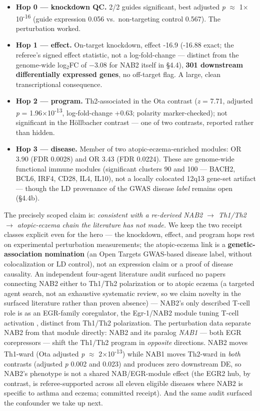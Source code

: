 \begin{itemize}
\tightlist
\item
  \textbf{Hop 0 --- knockdown QC.} 2/2 guides significant, best adjusted \emph{p} $\approx$ 1$\times$10\textsuperscript{-}\textsuperscript{1}\textsuperscript{6} (guide expression 0.056
  vs.~non-targeting control 0.567). The perturbation worked.
\item
  \textbf{Hop 1 --- effect.} On-target knockdown, effect -16.9 (-16.88 exact; the referee's signed effect
  statistic, not a log-fold-change --- distinct from the genome-wide log$_2$FC of $-3.08$ for NAB2 itself in
  \S{}4.4), \textbf{301 downstream differentially expressed genes}, no off-target flag. A large, clean
  transcriptional consequence.
\item
  \textbf{Hop 2 --- program.} Th2-associated in the Ota contrast \cite{ota2021} (\emph{z} = 7.71, adjusted \emph{p} = 1.96$\times$10\textsuperscript{-}\textsuperscript{1}\textsuperscript{3},
  log-fold-change +0.63; polarity marker-checked); not significant in the H\"{o}llbacher contrast \cite{hollbacher2020} --- one of
  two contrasts, reported rather than hidden.
\item
  \textbf{Hop 3 --- disease.} Member of two atopic-eczema-enriched modules: OR 3.90 (FDR 0.0028) and OR 3.43
  (FDR 0.0224). These are genome-wide functional immune modules (significant clusters 90 and 100 ---
  BACH2, BCL6, IRF4, CD28, IL4, IL10), not a locally colocated 12q13 gene-set artifact --- though the LD
  provenance of the GWAS disease \emph{label} remains open (\S{}4.4b).
\end{itemize}

The precisely scoped claim is: \emph{consistent with a re-derived NAB2 $\rightarrow$ Th1/Th2 $\rightarrow$ atopic-eczema chain the literature
has not made.} We keep the two receipt classes explicit even for the hero --- the knockdown, effect, and
program hops rest on experimental perturbation measurements; the atopic-eczema link is a \textbf{genetic-
association nomination} (an Open Targets GWAS-based disease label, without colocalization or LD control),
not an expression claim or a proof of disease causality. An independent four-agent literature audit surfaced
no papers connecting NAB2 either to Th1/Th2 polarization or to atopic eczema (a targeted agent search, not
an exhaustive systematic review, so we claim novelty in the surfaced literature rather than proven absence)
--- NAB2's only described T-cell role is as an EGR-family coregulator, the Egr-1/NAB2 module tuning T-cell
activation \cite{collins2008}, distinct from Th1/Th2 polarization. The perturbation data separate NAB2 from
that module directly: NAB2 and its paralog \emph{NAB1} --- both EGR corepressors --- shift the Th1/Th2 program
in \emph{opposite} directions. NAB2 moves Th1-ward (Ota adjusted \emph{p} $\approx$ 2$\times$10\textsuperscript{-}\textsuperscript{1}\textsuperscript{3})
while NAB1 moves Th2-ward in \emph{both} contrasts (adjusted \emph{p} 0.002 and 0.023) and produces zero
downstream DE, so NAB2's phenotype is not a shared NAB/EGR-module effect (the EGR2 hub, by contrast, is
referee-supported across all eleven eligible diseases where NAB2 is specific to asthma and eczema; committed
receipt). And the same audit surfaced the confounder we take up next.

